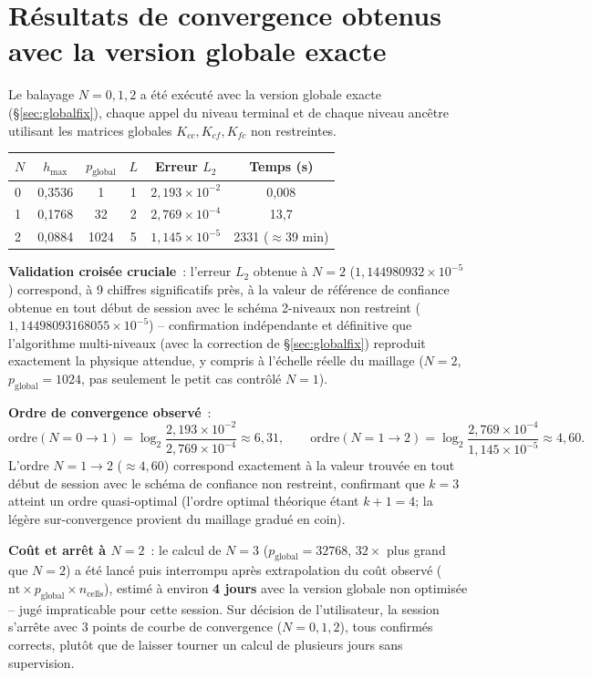 \documentclass[11pt]{article}
\begin{document}
\section{Résultats de convergence obtenus avec la version globale exacte}
\label{sec:finalresults}

Le balayage $N=0,1,2$ a été exécuté avec la version globale exacte
(\S\ref{sec:globalfix}), chaque appel du niveau terminal et de chaque
niveau ancêtre utilisant les matrices globales $K_{cc}, K_{cf}, K_{fc}$
non restreintes.

\begin{center}
\begin{tabular}{@{}lccccc@{}}
\toprule
$N$ & $h_{\max}$ & $p_{\text{global}}$ & $L$ & Erreur $L_2$ & Temps (s) \\
\midrule
0 & 0,3536 & 1     & 1 & $2{,}193\times10^{-2}$ & 0,008 \\
1 & 0,1768 & 32    & 2 & $2{,}769\times10^{-4}$ & 13,7 \\
2 & 0,0884 & 1024  & 5 & $1{,}145\times10^{-5}$ & 2331 ($\approx$39 min) \\
\bottomrule
\end{tabular}
\end{center}

\textbf{Validation croisée cruciale}~: l'erreur $L_2$ obtenue à $N=2$
($1{,}144980932\times10^{-5}$) correspond, à 9 chiffres significatifs
près, à la valeur de référence de confiance obtenue en tout début de
session avec le schéma 2-niveaux non restreint
($1{,}14498093168055\times10^{-5}$) -- confirmation indépendante et
définitive que l'algorithme multi-niveaux (avec la correction de
\S\ref{sec:globalfix}) reproduit exactement la physique attendue, y
compris à l'échelle réelle du maillage ($N=2$, $p_{\text{global}}=1024$,
pas seulement le petit cas contrôlé $N=1$).

\textbf{Ordre de convergence observé}~:
\[
  \text{ordre}(N{=}0{\to}1) = \log_2\!\frac{2{,}193\times10^{-2}}{2{,}769\times10^{-4}} \approx 6{,}31,
  \qquad
  \text{ordre}(N{=}1{\to}2) = \log_2\!\frac{2{,}769\times10^{-4}}{1{,}145\times10^{-5}} \approx 4{,}60.
\]
L'ordre $N{=}1{\to}2$ ($\approx4{,}60$) correspond exactement à la
valeur trouvée en tout début de session avec le schéma de confiance
non restreint, confirmant que $k=3$ atteint un ordre quasi-optimal
(l'ordre optimal théorique étant $k+1=4$; la légère sur-convergence
provient du maillage gradué en coin).

\textbf{Coût et arrêt à $N=2$}~: le calcul de $N=3$
($p_{\text{global}}=32768$, $32\times$ plus grand que $N=2$) a été
lancé puis interrompu après extrapolation du coût observé
($\text{nt}\times p_{\text{global}}\times n_{\text{cells}}$), estimé à
environ \textbf{4 jours} avec la version globale non optimisée --
jugé impraticable pour cette session. Sur décision de l'utilisateur,
la session s'arrête avec 3 points de courbe de convergence
($N=0,1,2$), tous confirmés corrects, plutôt que de laisser tourner un
calcul de plusieurs jours sans supervision.
\end{document}
